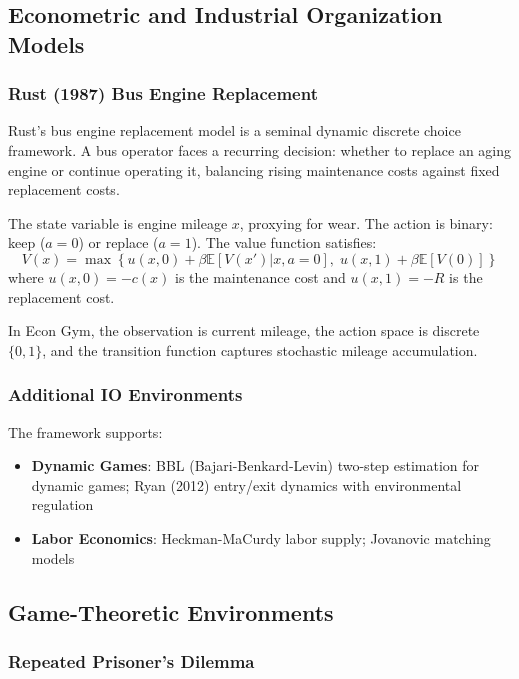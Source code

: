 \documentclass[12pt]{article}
\begin{document}
\subsection{Econometric and Industrial Organization Models}

\subsubsection{Rust (1987) Bus Engine Replacement}

Rust's bus engine replacement model is a seminal dynamic discrete choice framework. A bus operator faces a recurring decision: whether to replace an aging engine or continue operating it, balancing rising maintenance costs against fixed replacement costs.

The state variable is engine mileage $x$, proxying for wear. The action is binary: keep ($a=0$) or replace ($a=1$). The value function satisfies:
\begin{equation}
    V(x) = \max \left\{ u(x, 0) + \beta \mathbb{E}[V(x') | x, a=0], \; u(x, 1) + \beta \mathbb{E}[V(0)] \right\}
\end{equation}
where $u(x, 0) = -c(x)$ is the maintenance cost and $u(x, 1) = -R$ is the replacement cost.

In Econ Gym, the observation is current mileage, the action space is discrete $\{0, 1\}$, and the transition function captures stochastic mileage accumulation.

\subsubsection{Additional IO Environments}

The framework supports:
\begin{itemize}
    \item \textbf{Dynamic Games}: BBL (Bajari-Benkard-Levin) two-step estimation for dynamic games; Ryan (2012) entry/exit dynamics with environmental regulation
    \item \textbf{Labor Economics}: Heckman-MaCurdy labor supply; Jovanovic matching models
\end{itemize}

\subsection{Game-Theoretic Environments}

\subsubsection{Repeated Prisoner's Dilemma}
\end{document}
